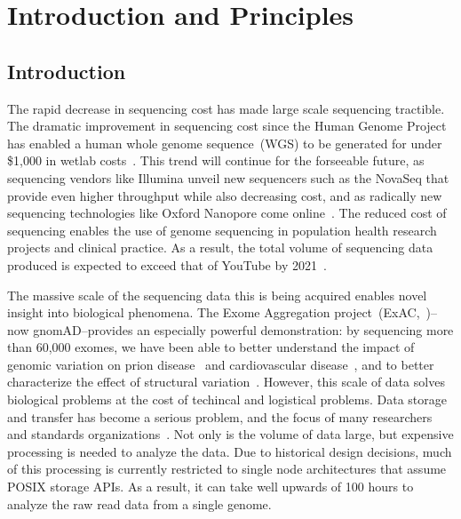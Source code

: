 \documentclass[phd]{ucbthesis}
\begin{document}
\tableofcontents

\mainmatter

\part{Introduction and Principles}

\chapter{Introduction}
\label{chap:introduction}

The rapid decrease in sequencing cost has made large scale sequencing
tractible. The dramatic improvement in sequencing cost since the Human
Genome Project has enabled a human whole genome sequence~(WGS) to be
generated for under \$1,000 in wetlab costs~\cite{nhgri}. This trend
will continue for the forseeable future, as sequencing vendors like
Illumina unveil new sequencers such as the NovaSeq that provide even
higher throughput while also decreasing cost, and as radically new
sequencing technologies like Oxford Nanopore come online~\cite{jain17}.
The reduced cost of sequencing enables the use of genome sequencing in
population health research projects and clinical practice. As a result,
the total volume of sequencing data produced is expected to exceed that
of YouTube by 2021~\cite{stephens15}.

The massive scale of the sequencing data this is being acquired enables
novel insight into biological phenomena. The Exome Aggregation
project~(ExAC,~\cite{lek16})--now gnomAD--provides an especially powerful
demonstration: by sequencing more than 60,000 exomes, we have been able
to better understand the impact of genomic variation on prion
disease~\cite{minikel16} and cardiovascular disease~\cite{walsh16}, and to
better characterize the effect of structural variation~\cite{ruderfer16}.
However, this scale of data solves biological problems at the cost of techincal
and logistical problems. Data storage and transfer has become a serious problem,
and the focus of many researchers~\cite{fritz11, kozanitis11} and standards
organizations~\cite{paten15}. Not only is the volume of data large, but
expensive processing is needed to analyze the data. Due to historical design
decisions, much of this processing is currently restricted to single node
architectures that assume POSIX storage APIs. As a result, it can take well
upwards of 100 hours to analyze the raw read data from a single genome.
\end{document}
